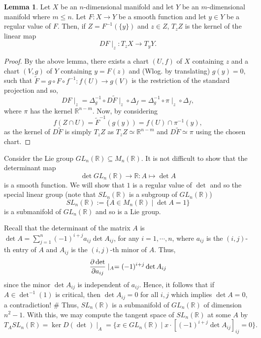 \documentclass[]{article}
\theoremstyle{definition}
\theoremstyle{definition}
\newtheorem{lemma}{Lemma}[section]
\begin{document}
\begin{lemma}
  Let \(X\) be an \(n\)-dimensional manifold and let \(Y\) be an \(m\)-dimensional 
  manifold where \(m \le n\). Let \(F : X \to Y\) be a smooth function and let 
  \(y \in Y\) be a regular value of \(F\). Then, if \(Z = F^{-1}(\{y\})\) and 
  \(z \in Z\), \(T_z Z\) is the kernel of the linear map 
  \[DF\mid_z : T_z X \to T_y Y.\]
\end{lemma}
\begin{proof}
  By the above lemma, there exists a chart \((U, f)\) of \(X\) containing 
  \(z\) and a chart \((V, g)\) of \(Y\) containing \(y = F(z)\) and 
  (Wlog. by translating) \(g(y) = 0\), such that
  \(\tilde F = g \circ F \circ f^{-1} : f(U) \to g(V)\) 
  is the restriction of the standard projection and so,
  \[DF\mid_z = \Delta_g^{-1} \circ D\tilde F\mid_z \circ \Delta_f = 
  \Delta_g^{-1} \circ \pi\mid_z \circ \Delta_f,\]
  where \(\pi\) has the kernel \(\mathbb{R}^{n - m}\). Now, by considering 
  \[f(Z \cap U) = \tilde F^{-1}(g(y)) = f(U) \cap \pi^{-1}(y),\]
  as the kernel of \(D\tilde F\) is simply \(T_z Z\) as 
  \(T_z Z \simeq \mathbb{R}^{n - m}\) and \(D\tilde F \simeq \pi\) using 
  the chosen chart.
\end{proof}

Consider the Lie group \(GL_n(\mathbb{R}) \subseteq M_n(\mathbb{R})\). It 
is not difficult to show that the determinant map 
\[\det GL_n(\mathbb{R}) \to \mathbb{R} : A \mapsto \det A\]
is a smooth function. We will show that \(1\) is a regular value of 
\(\det\) and so the special linear group (note that \(SL_n(\mathbb{R})\) is 
a subgroup of \(GL_n(\mathbb{R})\))
\[SL_n(\mathbb{R}) := \{A \in M_n(\mathbb{R}) \mid \det A = 1\}\]
is a submanifold of \(GL_n(\mathbb{R})\) and so is a Lie group.

Recall that the determinant of the matrix \(A\) is 
\(\det A = \sum_{j = 1}^n (-1)^{i + j}a_{ij}\det A_{ij}\),
for any \(i = 1,\cdots, n\),
where \(a_{ij}\) is the \((i, j)\)-th entry of \(A\) and \(A_{ij}\) is the 
\((i, j)\)-th minor of \(A\). Thus, 
\[\pdv{\det}{a_{ij}}\mid_A = (-1)^{i + j} \det A_{ij}\] 
since the minor 
\(\det A_{ij}\) is independent of \(a_{ij}\). Hence, it follows that if 
\(A \in \det^{-1}(1)\) is critical, then \(\det A_{ij} = 0\) for all \(i, j\) 
which implies \(\det A = 0\), a contradiction! \# Thus, \(SL_n(\mathbb{R})\) is 
a submanifold of \(GL_n(\mathbb{R})\) of dimension \(n^2 - 1\). With this, 
we may compute the tangent space of \(SL_n(\mathbb{R})\) at some \(A\) by 
\[T_A SL_n(\mathbb{R}) = \ker D(\det)\mid_A =
  \{x \in GL_n(\mathbb{R}) \mid x \cdot [(-1)^{i + j} \det A_{ij}]_{ij} = 0\}.\]
\end{document}
